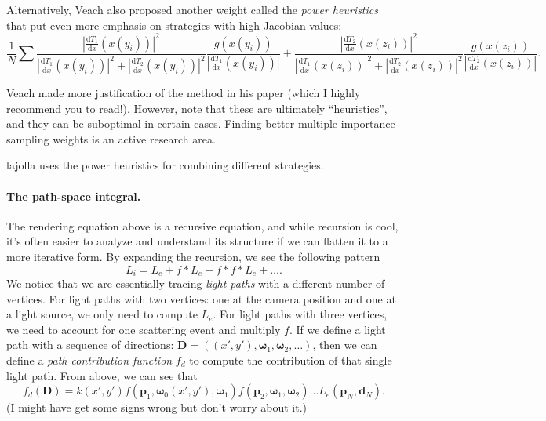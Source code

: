 Alternatively, Veach also proposed another weight called the \emph{power heuristics} that put even more emphasis on strategies with high Jacobian values:
\begin{equation}
\frac{1}{N} \sum
\frac{|\frac{\mathrm{d}T_1}{\mathrm{d}x}(x(y_i))|^2}{|\frac{\mathrm{d}T_1}{\mathrm{d}x}(x(y_i))|^2 + |\frac{\mathrm{d}T_2}{\mathrm{d}x}(x(y_i))|^2}
\frac{g(x(y_i))}{|\frac{\mathrm{d}T_1}{\mathrm{d}x}(x(y_i))|} + 
\frac{|\frac{\mathrm{d}T_2}{\mathrm{d}x}(x(z_i))|^2}{|\frac{\mathrm{d}T_1}{\mathrm{d}x}(x(z_i))|^2 + |\frac{\mathrm{d}T_2}{\mathrm{d}x}(x(z_i))|^2}
\frac{g(x(z_i))}{|\frac{\mathrm{d}T_2}{\mathrm{d}x}(x(z_i))|}.
\end{equation}

Veach made more justification of the method in his paper (which I highly recommend you to read!). However, note that these are ultimately ``heuristics'', and they can be suboptimal in certain cases. Finding better multiple importance sampling weights is an active research area.

lajolla uses the power heuristics for combining different strategies.

\paragraph{The path-space integral.} The rendering equation above is a recursive equation, and while recursion is cool, it's often easier to analyze and understand its structure if we can flatten it to a more iterative form. By expanding the recursion, we see the following pattern
\begin{equation}
    L_i = L_e + f * L_e + f * f * L_e + \dots.
\end{equation}
We notice that we are essentially tracing \emph{light paths} with a different number of vertices. For light paths with two vertices: one at the camera position and one at a light source, we only need to compute $L_e$. For light paths with three vertices, we need to account for one scattering event and multiply $f$. If we define a light path with a sequence of directions: $\mathbf{D} = ((x', y'), \mathbf{\omega}_1, \mathbf{\omega}_2, \dots)$, then we can define a \emph{path contribution function} $f_d$ to compute the contribution of that single light path. From above, we can see that
\begin{equation}
    f_d(\mathbf{D}) = k(x', y') f(\mathbf{p}_1, \mathbf{\omega}_0(x', y'), \mathbf{\omega}_1) f(\mathbf{p}_2, \mathbf{\omega}_1, \mathbf{\omega}_2) \dots L_e(\mathbf{p}_N, \mathbf{d}_N).
\end{equation}
(I might have get some signs wrong but don't worry about it.)

